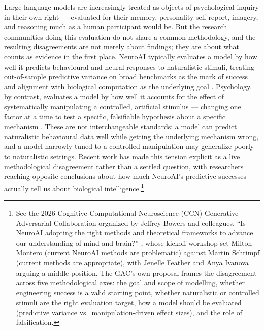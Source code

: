 \documentclass[11pt]{article}
\begin{document}
Large language models are increasingly treated as objects of psychological
inquiry in their own right \citep{hagendorff2023machinepsych,
binz2023gpt3cogpsy} — evaluated for their memory, personality self-report,
imagery, and reasoning much as a human participant would be. But the
research communities doing this evaluation do not share a common
methodology, and the resulting disagreements are not merely about findings;
they are about what counts as evidence in the first place. NeuroAI
typically evaluates a model by how well it predicts behavioural and neural
responses to naturalistic stimuli, treating out-of-sample predictive
variance on broad benchmarks as the mark of success and alignment with
biological computation as the underlying goal \citep{binz2025foundation}.
Psychology, by contrast, evaluates a model by how well it accounts for the
effect of systematically manipulating a controlled, artificial stimulus —
changing one factor at a time to test a specific, falsifiable hypothesis
about a specific mechanism \citep{bowers2023deepproblems}. These are not
interchangeable standards: a model can predict naturalistic behavioural
data well while getting the underlying mechanism wrong, and a model
narrowly tuned to a controlled manipulation may generalize poorly to
naturalistic settings. Recent work has made this tension explicit as a
live methodological disagreement rather than a settled question, with
researchers reaching opposite conclusions about how much NeuroAI's
predictive successes actually tell us about biological
intelligence.\footnote{See the 2026 Cognitive Computational Neuroscience
(CCN) Generative Adversarial Collaboration organized by Jeffrey Bowers and
colleagues, ``Is NeuroAI adopting the right methods and theoretical
frameworks to advance our understanding of mind and brain?''
\citep{gac2026neuroai}, whose kickoff workshop set Milton Montero
(current NeuroAI methods are problematic) against Martin Schrimpf (current
methods are appropriate), with Jenelle Feather and Anya Ivanova arguing a
middle position. The GAC's own proposal frames the disagreement across
five methodological axes: the goal and scope of modelling, whether
engineering success is a valid starting point, whether naturalistic or
controlled stimuli are the right evaluation target, how a model should be
evaluated (predictive variance vs.\ manipulation-driven effect sizes), and
the role of falsification.}
\end{document}
